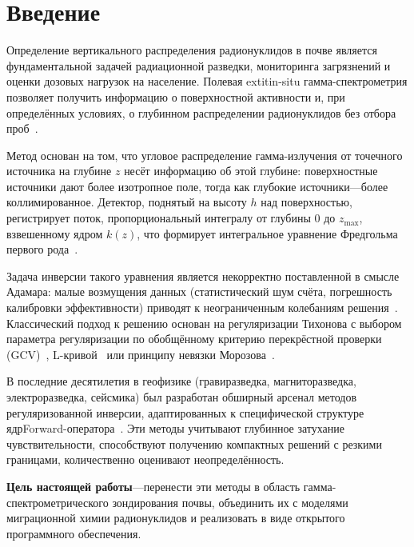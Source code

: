 \documentclass[12pt,a4paper]{article}
\begin{document}
\tableofcontents
\newpage

\section{Введение}
\label{sec:intro}

Определение вертикального распределения радионуклидов в почве является
фундаментальной задачей радиационной разведки, мониторинга загрязнений
и оценки дозовых нагрузок на население.
Полевая 	extit{in-situ} гамма-спектрометрия позволяет получить информацию
о поверхностной активности и, при определённых условиях, о глубинном
распределении радионуклидов без отбора проб~\citep{Beck1968, Zombori1992, Tyler2008}.

Метод основан на том, что угловое распределение гамма-излучения от
точечного источника на глубине $z$ несёт информацию об этой глубине:
поверхностные источники дают более изотропное поле, тогда как глубокие
источники---более коллимированное. Детектор, поднятый на высоту $h$ над
поверхностью, регистрирует поток, пропорциональный интегралу
от глубины $0$ до $z_{\max}$, взвешенному ядром $k(z)$,
что формирует интегральное уравнение Фредгольма первого рода~\citep{Beck1968}.

Задача инверсии такого уравнения является некорректно поставленной
в смысле Адамара: малые возмущения данных (статистический шум счёта,
погрешность калибровки эффективности) приводят к неограниченным
колебаниям решения~\citep{Engl1996, Hansen1998}.
Классический подход к решению основан на регуляризации Тихонова
с выбором параметра регуляризации по обобщённому критерию
перекрёстной проверки (GCV)~\citep{Golub1979}, L-кривой~\citep{Hansen1992}
или принципу невязки Морозова~\citep{Morozov1966}.

В последние десятилетия в геофизике (гравиразведка, магниторазведка,
электроразведка, сейсмика) был разработан обширный арсенал методов
регуляризованной инверсии, адаптированных к специфической структуре
ядрForward-оператора~\citep{LiOldenburg1996, LiOldenburg1998, Zhdanov2002,
Portniaguine1999, Vatankhah2018, Chen2024}.
Эти методы учитывают глубинное затухание чувствительности,
способствуют получению компактных решений с резкими границами,
количественно оценивают неопределённость.

\textbf{Цель настоящей работы}---перенести эти методы в область
гамма-спектрометрического зондирования почвы, объединить их с
моделями миграционной химии радионуклидов и реализовать в виде
открытого программного обеспечения.
\end{document}
